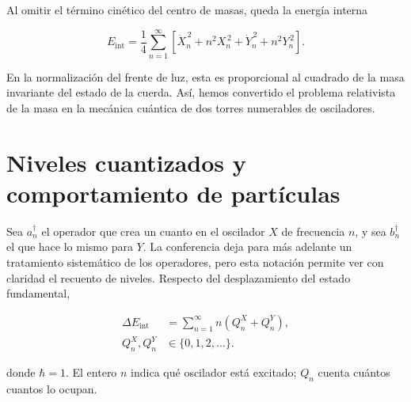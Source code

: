 \begin{classroomqa}
\end{classroomqa}

Al omitir el término cinético del centro de masas, queda la energía interna

\begin{equation}
  E_{\mathrm{int}}
  =
  \frac14
  \sum_{n=1}^{\infty}
  \left[
    \dot X_n^{\,2}+n^2X_n^{\,2}
    +\dot Y_n^{\,2}+n^2Y_n^{\,2}
  \right].
  \label{eq:l02-internal-energy}
\end{equation}

En la normalización del frente de luz, esta es proporcional al cuadrado de la masa invariante del estado de la cuerda. Así, hemos convertido el problema relativista de la masa en la mecánica cuántica de dos torres numerables de osciladores.

\section{Niveles cuantizados y comportamiento de partículas}

Sea \(a_n^\dagger\) el operador que crea un cuanto en el oscilador \(X\) de frecuencia \(n\), y sea \(b_n^\dagger\) el que hace lo mismo para \(Y\). La conferencia deja para más adelante un tratamiento sistemático de los operadores, pero esta notación permite ver con claridad el recuento de niveles. Respecto del desplazamiento del estado fundamental,

\begin{equation}
  \begin{aligned}
    \Delta E_{\mathrm{int}}
    &=\sum_{n=1}^{\infty}n\left(Q_n^X+Q_n^Y\right),\\
    Q_n^X,Q_n^Y&\in\{0,1,2,\ldots\}.
  \end{aligned}
  \label{eq:l02-quantized-energy}
\end{equation}

donde \(\hbar=1\). El entero \(n\) indica qué oscilador está excitado; \(Q_n\) cuenta cuántos cuantos lo ocupan.

